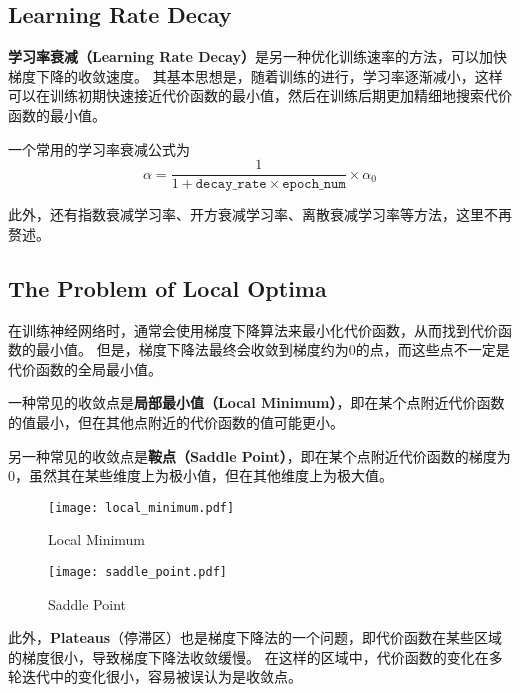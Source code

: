 \subsection{Learning Rate Decay}

\textbf{学习率衰减（Learning Rate Decay）}是另一种优化训练速率的方法，可以加快梯度下降的收敛速度。
其基本思想是，随着训练的进行，学习率逐渐减小，这样可以在训练初期快速接近代价函数的最小值，然后在训练后期更加精细地搜索代价函数的最小值。

一个常用的学习率衰减公式为
\begin{equation}
    \alpha = \frac{1}{1 + \mathtt{decay\_rate} \times \mathtt{epoch\_num}} \times \alpha_0
\end{equation}

此外，还有指数衰减学习率、开方衰减学习率、离散衰减学习率等方法，这里不再赘述。

\subsection{The Problem of Local Optima}

在训练神经网络时，通常会使用梯度下降算法来最小化代价函数，从而找到代价函数的最小值。
但是，梯度下降法最终会收敛到梯度约为0的点，而这些点不一定是代价函数的全局最小值。

一种常见的收敛点是\textbf{局部最小值（Local Minimum）}，即在某个点附近代价函数的值最小，但在其他点附近的代价函数的值可能更小。

另一种常见的收敛点是\textbf{鞍点（Saddle Point）}，即在某个点附近代价函数的梯度为0，虽然其在某些维度上为极小值，但在其他维度上为极大值。
\begin{figure}[h!bt]
    \centering
    \begin{minipage}[t]{0.48\textwidth}
        \centering
        \texttt{[image: local\_minimum.pdf]}
        \caption{Local Minimum}
        \label{fig:local_minimum}
    \end{minipage}
    \begin{minipage}[t]{0.48\textwidth}
        \centering
        \texttt{[image: saddle\_point.pdf]}
        \caption{Saddle Point}
        \label{fig:saddle_point}
    \end{minipage}
\end{figure}

此外，\textbf{Plateaus}（停滞区）也是梯度下降法的一个问题，即代价函数在某些区域的梯度很小，导致梯度下降法收敛缓慢。
在这样的区域中，代价函数的变化在多轮迭代中的变化很小，容易被误认为是收敛点。

